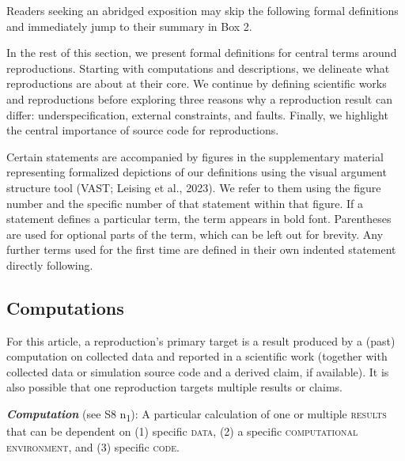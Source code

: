\documentclass[authordate, meta]{jote-new-article}
\begin{document}
	


	Readers seeking an abridged exposition may skip the following formal definitions and immediately jump to their summary in Box 2.


	In the rest of this section, we present formal definitions for central terms around reproductions. Starting with computations and descriptions, we delineate what reproductions are about at their core. We continue by defining scientific works and reproductions before exploring three reasons why a reproduction result can differ: underspecification, external constraints, and faults. Finally, we highlight the central importance of source code for reproductions.


	Certain statements are accompanied by figures in the supplementary material representing formalized depictions of our definitions using the visual argument structure tool (VAST; Leising et al., 2023). We refer to them using the figure number and the specific number of that statement within that figure. If a statement defines a particular term, the term appears in bold font. Parentheses are used for optional parts of the term, which can be left out for brevity. Any further terms used for the first time are defined in their own indented statement directly following.



	\subsection{Computations}



	For this article, a reproduction's primary target is a result produced by a (past) computation on collected data and reported in a scientific work (together with collected data or simulation source code and a derived claim, if available). It is also possible that one reproduction targets multiple results or claims.

	\vspace{\topsep}


	\noindent\emph{\textbf{Computation}} (see S8 \rightarrow{ }n\textsubscript{1}): A particular calculation of one or multiple \textsc{results} that can be dependent on (1) specific \textsc{data}, (2) a specific \textsc{computational environment,} and (3) specific \textsc{code}.
\end{document}
